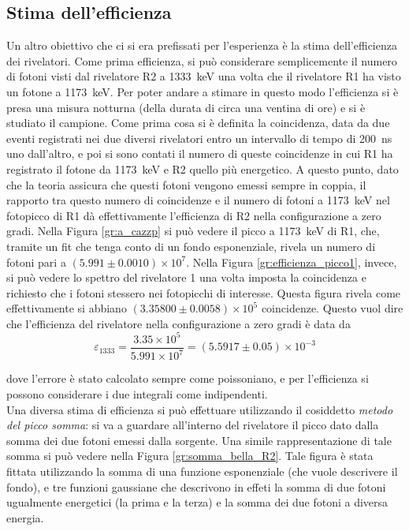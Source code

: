 \subsection{Stima dell'efficienza}
Un altro obiettivo che ci si era prefissati per l'esperienza è la stima dell'efficienza dei rivelatori. Come prima efficienza, si può considerare semplicemente il numero
di fotoni visti dal rivelatore R2 a 1333~keV una volta che il rivelatore R1 ha visto un fotone a 1173~keV. Per poter andare a stimare in questo modo l'efficienza si è presa
una misura notturna (della durata di circa una ventina di ore) e si è studiato il campione. Come prima cosa si è definita la coincidenza, data da due eventi
registrati nei due diversi rivelatori entro un intervallo di tempo di 200~ns uno dall'altro, e poi si sono contati il numero di queste coincidenze in cui R1 ha registrato
il fotone da 1173~keV e R2 quello più energetico. A questo punto, dato che la teoria assicura che questi fotoni vengono emessi sempre in coppia, il rapporto tra questo
numero di coincidenze e il numero di fotoni a 1173~keV nel fotopicco di R1 dà effettivamente l'efficienza di R2 nella configurazione a zero gradi. Nella
Figura \ref{gr:a_cazzp} si può vedere il picco a 1173~keV di R1, che, tramite un fit che tenga conto di un fondo esponenziale, rivela un numero
di fotoni pari a $(5.991 \pm 0.0010)\times 10^7$.
Nella Figura \ref{gr:efficienza_picco1}, invece, si può vedere lo spettro del rivelatore 1 una volta imposta la coincidenza e richiesto che i fotoni stessero
nei fotopicchi di interesse. Questa figura rivela come effettivamente si abbiano $(3.35800 \pm 0.0058)\times 10^5$ coincidenze. Questo vuol dire che l'efficienza del 
rivelatore nella configurazione
a zero gradi è data da
$$\varepsilon_{1333}=\frac{3.35\times 10^5}{5.991 \times 10^7}=(5.5917 \pm 0.05)\times 10^{-3}$$

%

dove l'errore è stato calcolato sempre come poissoniano, e per l'efficienza si possono considerare i due integrali come indipendenti.\\

\FloatBarrier
Una diversa stima di efficienza si può effettuare utilizzando il cosiddetto \textit{metodo del picco somma}: si va a guardare all'interno del rivelatore il picco dato dalla 
somma dei due fotoni emessi dalla sorgente. Una simile rappresentazione di tale somma si può vedere nella Figura \ref{gr:somma_bella_R2}. Tale figura è stata fittata 
utilizzando la somma di una funzione esponenziale (che vuole descrivere il fondo), e tre funzioni gaussiane che descrivono in effeti la somma di due fotoni ugualmente energetici
(la prima e la terza) e la somma dei due fotoni a diversa energia.\\


